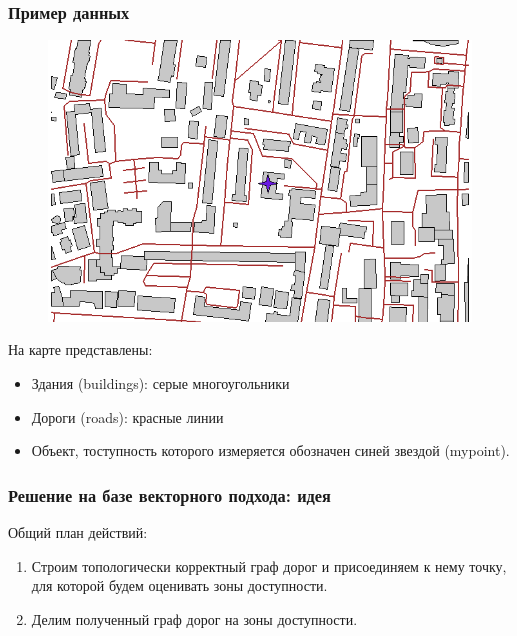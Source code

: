 \begin{frame}
    \frametitle{Пример данных}
    \begin{figure}[!ht]
        \begin{center}
            \includegraphics[width=0.6\columnwidth]{./practic/img/area_of_interest.png}
        \end{center}
    \end{figure}
    На карте представлены:
    \begin{itemize}
        \item Здания (buildings): серые многоугольники
        \item Дороги (roads): красные линии
        \item Объект, тоступность которого измеряется обозначен синей звездой (mypoint).
    \end{itemize}

\end{frame}

\begin{frame}
    \frametitle{Решение на базе векторного подхода: идея}
    Общий план действий:
    \begin{enumerate}
        \item Строим топологически корректный граф дорог и присоединяем к нему точку, для которой будем оценивать зоны доступности.
        \item Делим полученный граф дорог на зоны доступности.
    \end{enumerate}
\end{frame}

